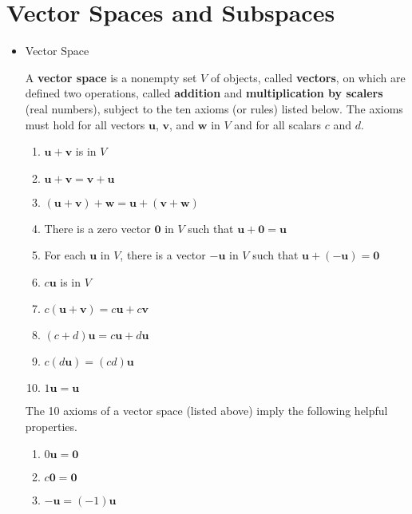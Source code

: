 \documentclass[10pt]{book}
\newenvironment{boxdef}{\begin{mdframed}[backgroundcolor=gray!30,linewidth=0pt,nobreak=true]}{\end{mdframed}}
\newcommand{\vect}[1]{\ensuremath{\boldsymbol{\mathbf{#1}}}}
\begin{document}
\section{Vector Spaces and Subspaces}
\begin{itemize}
	\item Vector Space
	\begin{boxdef}
		A \textbf{vector space} is a nonempty set $V$ of objects, called \textbf{vectors}, on which are defined two operations, called \textbf{addition} and \textbf{multiplication by scalers} (real numbers), subject to the ten axioms (or rules) listed below. The axioms must hold for all vectors $\vect{u}$, $\vect{v}$, and $\vect{w}$ in $V$ and for all scalars $c$ and $d$.
		\vspace{-1em}
		\begin{multicols}{2}
			\begin{enumerate}\itemsep0em
				\item $\vect{u}+\vect{v}$ is in $V$
				\item $\vect{u}+\vect{v}=\vect{v}+\vect{u}$
				\item $(\vect{u}+\vect{v}) + \vect{w} = \vect{u} + (\vect{v}+\vect{w})$
				\item There is a zero vector $\vect{0}$ in $V$ such that $\vect{u}+\vect{0}=\vect{u}$
				\item For each $\vect{u}$ in $V$, there is a vector $-\vect{u}$ in $V$ such that $\vect{u}+(-\vect{u}) = \vect{0}$
				\columnbreak
				\item $c\vect{u}$ is in $V$
				\item $c(\vect{u}+\vect{v}) = c\vect{u} + c\vect{v}$
				\item $(c+d)\vect{u} = c\vect{u} + d\vect{u}$
				\item $c(d\vect{u}) = (cd)\vect{u}$
				\item $1\vect{u} = \vect{u}$
			\end{enumerate}
		\end{multicols}
	\end{boxdef}
	\begin{boxdef}
		The 10 axioms of a vector space (listed above) imply the following helpful properties.
		\vspace{-1em}
		\begin{multicols}{3}
			\begin{enumerate}\itemsep0em
				\item $0\vect{u}=\vect{0}$
				\item $c\vect{0}=\vect{0}$
				\item $-\vect{u}=(-1)\vect{u}$

\end{enumerate}
\end{multicols}
\end{boxdef}
\end{itemize}
\end{document}
